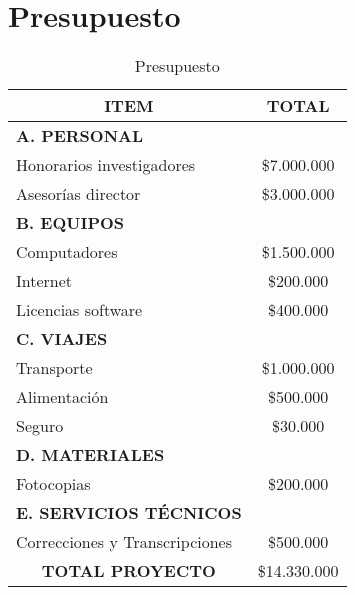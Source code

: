 \pagebreak
\section{Presupuesto}
\begin{table}[htbp]
  \centering
    \begin{tabular}{cc}
    \hline
    \textbf{ITEM} & \textbf{TOTAL} \\
    \hline
    \multicolumn{1}{l}{\textbf{A. PERSONAL}} &  \\
    \multicolumn{1}{l}{Honorarios investigadores} & \$7.000.000 \\
    \multicolumn{1}{l}{Asesor\'{i}as director} & \$3.000.000 \\
    \multicolumn{1}{l}{\textbf{B. EQUIPOS}} &  \\
    \multicolumn{1}{l}{Computadores} & \$1.500.000 \\
    \multicolumn{1}{l}{Internet} & \$200.000 \\
    \multicolumn{1}{l}{Licencias software} & \$400.000 \\
    \multicolumn{1}{l}{\textbf{C. VIAJES}} &  \\
    \multicolumn{1}{l}{Transporte} & \$1.000.000 \\
    \multicolumn{1}{l}{Alimentaci\'{o}n} & \$500.000 \\
    \multicolumn{1}{l}{Seguro} & \$30.000 \\
    \multicolumn{1}{l}{\textbf{D. MATERIALES}} &  \\
    \multicolumn{1}{l}{Fotocopias} & \$200.000 \\
    \multicolumn{1}{l}{\textbf{E. SERVICIOS T\'{E}CNICOS}} &  \\
    \multicolumn{1}{l}{Correcciones y Transcripciones} & \$500.000 \\
    \hline
    \textbf{TOTAL PROYECTO} & \$14.330.000 \\
    \hline
    \end{tabular}%
  \label{tab:addlabel}%
  \caption{Presupuesto}
\end{table}%
